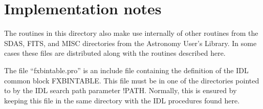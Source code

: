 \section{Implementation notes}

The routines in this directory also make use internally of other routines from
the SDAS, FITS, and MISC directories from the Astronomy User's Library.  In
some cases these files are distributed along with the routines described here.

The file ``fxbintable.pro'' is an include file containing the definition of the
IDL common block FXBINTABLE.  This file must be in one of the directories
pointed to by the IDL search path parameter !PATH\@.  Normally, this is ensured
by keeping this file in the same directory with the IDL procedures found here.



